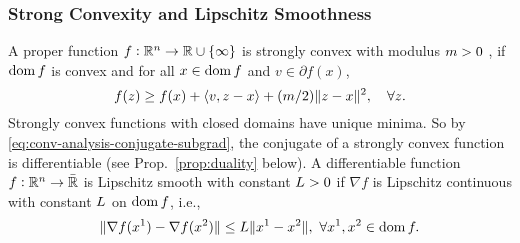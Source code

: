 \subsubsection{Strong Convexity and Lipschitz Smoothness}
\label{subsubsec:strong-convexity-and-lipschitz-smoothness}

A proper function $f: \mathbb{R}^n \rightarrow \mathbb{R} \cup \{\infty\}$ is strongly convex with modulus $m > 0$ , if $\operatorname{dom}{f}$ is convex and for all $x \in \operatorname{dom}{f}$ and $v \in \partial f(x)$,
\begin{equation}
    f(z) \geq f(x) + \langle v, z - x\rangle + (m/2) \lVert z - x\rVert^2, \quad \forall z.
\end{equation}
Strongly convex functions with closed domains have unique minima.
So by \eqref{eq:conv-analysis-conjugate-subgrad}, the conjugate of a strongly convex function is differentiable (see Prop.~\ref{prop:duality} below).
A differentiable function $f: \mathbb{R}^n \rightarrow \bar{\mathbb{R}}$ is Lipschitz smooth with constant $L > 0$  if $\nabla f$ is Lipschitz continuous with constant $L$ on $\operatorname{dom}{f}$, i.e.,
\begin{equation}
    \lVert \nabla f(x^1) - \nabla f(x^2) \rVert \leq L \lVert x^1 - x^2 \rVert, \ \forall x^1, x^2 \in \operatorname{dom}{f}.
\end{equation}

